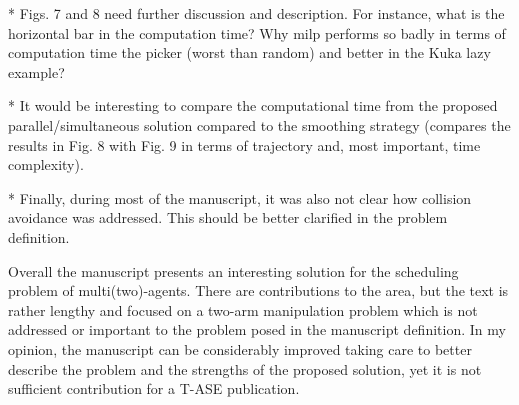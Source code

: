 \documentclass[journal]{IEEEtran}
\begin{document}
	\begin{partt}
		* Figs. 7 and 8 need further discussion and description.  For instance, what is the horizontal bar in the computation time? Why milp performs so badly in terms of computation time the picker (worst than random) and better in the Kuka lazy example?  
	\end{partt}
	
	\begin{partt}
		* It would be interesting to compare the computational time from the proposed parallel/simultaneous solution compared to the smoothing strategy (compares the results in Fig. 8 with Fig. 9 in terms of trajectory and, most important, time complexity).
	\end{partt}
	
	\begin{partt}
		* Finally, during most of the manuscript, it was also not clear how collision avoidance was addressed.  This should be better clarified in the problem definition.
	\end{partt}
	
	\begin{partt}
		
		Overall the manuscript presents an interesting solution for the scheduling problem of multi(two)-agents. There are contributions to the area, but the text is rather lengthy and focused on a two-arm manipulation problem which is not addressed or important to the problem posed in the manuscript definition. In my opinion, the manuscript can be considerably improved taking care to better describe the problem and the strengths of the proposed solution, yet it is not sufficient contribution for a T-ASE publication.  
	\end{partt}
	
\end{document}
